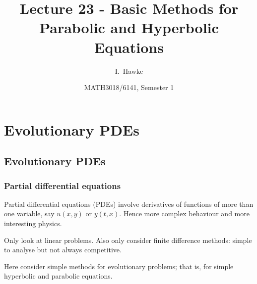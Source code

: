 \documentclass{beamer}
\title[Lecture 23] %
{Lecture 23 - Basic Methods for Parabolic and Hyperbolic Equations}
\author[I. Hawke] %
{I.~Hawke}
\institute[University of Southampton] %
{
  School of Mathematics, \\
  University of Southampton, UK
}
\date[Semester 1] %
{MATH3018/6141, Semester 1}
\begin{document}
\begin{frame}
  \titlepage
\end{frame}

\section{Evolutionary PDEs}

\subsection{Evolutionary PDEs}

\begin{frame}
  \frametitle{Partial differential equations}

  Partial differential equations (PDEs) involve derivatives of
  functions of more than one variable, say $u(x, y)$ or $y(t,
  x)$. Hence more complex behaviour and more interesting
  physics. \pause

  \vspace{1ex}

  Only look at linear problems.  Also only consider finite difference
  methods: simple to analyse but not always competitive. \pause

  \vspace{1ex}

  Here consider simple methods for evolutionary problems; that is, for
  simple hyperbolic and parabolic equations.

\end{frame}
\end{document}
